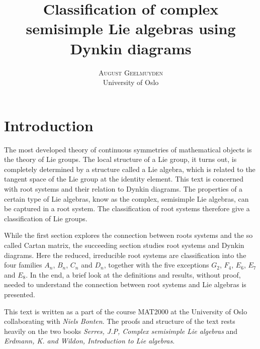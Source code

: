 \documentclass[twoside,utf8]{article}
\title{\vspace{-15mm}\fontsize{24pt}{10pt}\selectfont\textbf{Classification of complex semisimple Lie algebras using Dynkin diagrams}} %
\author{
\large
\textsc{August Geelmuyden} %
\\[2mm] %
\normalsize University of Oslo \\ %
\vspace{-5mm}
}
\date{}
\theoremstyle{plain}
\theoremstyle{definition}
\theoremstyle{remark}
\begin{document}
\maketitle %


\section{Introduction}
The most developed theory of continuous symmetries of mathematical objects is the theory of Lie groups. The local structure of a Lie group, it turns out, is completely determined by a structure called a Lie algebra, which is related to the tangent space of the Lie group at the identity element. This text is concerned with root systems and their relation to Dynkin diagrams. The properties of a certain type of Lie algebras, know as the complex, semisimple Lie algebras, can be captured in a root system. The classification of root systems therefore give a classification of Lie groups. 

While the first section explores the connection between roots systems and the so called Cartan matrix, the succeeding section studies root systems and Dynkin diagrams. Here the reduced, irreducible root systems are classification into the four families $A_n$, $B_n$, $C_n$ and $D_n$, together with the five exceptions $G_2$, $F_4$, $E_6$, $E_7$ and $E_8$. In the end, a brief look at the definitions and results, without proof, needed to understand the connection between root systems and Lie algebras is presented. 

This text is written as a part of the course MAT2000 at the University of Oslo collaborating with \textit{Niels Bonten}. The proofs and structure of the text rests heavily on the two books \textit{Serres, J.P, Complex semisimple Lie algebras}\cite{Serre} and \textit{Erdmann, K. and Wildon, Introduction to Lie algebras}\cite{LieAlgebrasIntroduction}. 





\begin{comment}
Lie groups common. Classified by Dynkin diagrams. The link is the concept of root systems. We will study root systems. Then the cartan matrix and coxeter graphs. These are clasified. Coxeter graphs is not sufficient -- needs Dynkin diagrams to properly represent all reduced, irreducible root systems. In the end we take a brief look at the factorization of semisimple complex Lie algebras and the relation to root systems.
\begin{itemize}
\item Results
\item What is about to happen in each section
\item Do not state importance of theorem
\item State assumptions: Any vectorspace is implicitly thought of as finite dimensional
\end{itemize}
\end{comment}
\end{document}
